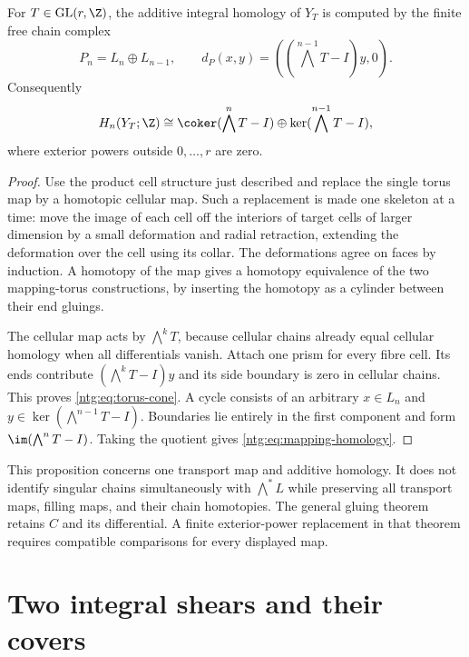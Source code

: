 \begin{proposition}\label{ntg:prop:mappingtorus}
For $T\in\mathrm{GL}(r,\Z)$, the additive integral homology of
$Y_T$ is computed by the finite free chain complex
\begin{equation}\label{ntg:eq:torus-cone}
 P_n=L_n\oplus L_{n-1},\qquad
 d_P(x,y)=((\bigwedge^{n-1}T-I)y,0).
\end{equation}
Consequently
\begin{equation}\label{ntg:eq:mapping-homology}
 H_n(Y_T;\Z)\cong
 \coker(\bigwedge^nT-I)\oplus
 \ker(\bigwedge^{n-1}T-I),
\end{equation}
where exterior powers outside $0,\ldots,r$ are zero.
\end{proposition}
\begin{proof}
Use the product cell structure just described and replace the single
torus map by a homotopic cellular map. Such a replacement is made
one skeleton at a time: move the image of each cell off the interiors
of target cells of larger dimension by a small deformation and radial
retraction, extending the deformation over the cell using its collar.
The deformations agree on faces by induction. A homotopy of the map
gives a homotopy equivalence of the two mapping-torus constructions,
by inserting the homotopy as a cylinder between their end gluings.

The cellular map acts by $\bigwedge^kT$, because cellular chains
already equal cellular homology when all differentials vanish.
Attach one prism for every fibre cell. Its ends contribute
$(\bigwedge^kT-I)y$ and its side boundary is zero in cellular
chains. This proves \eqref{ntg:eq:torus-cone}. A cycle consists of an
arbitrary $x\in L_n$ and $y\in\ker(\bigwedge^{n-1}T-I)$.
Boundaries lie entirely in the first component and form
$\im(\bigwedge^nT-I)$. Taking the quotient gives
\eqref{ntg:eq:mapping-homology}.
\end{proof}

This proposition concerns one transport map and additive homology.
It does not identify singular chains simultaneously with
$\bigwedge^*L$ while preserving all transport maps, filling maps,
and their chain homotopies. The general gluing theorem retains $C$
and its differential. A finite exterior-power replacement in that
theorem requires compatible comparisons for every displayed map.

\section{Two integral shears and their covers}\label{ntg:sec:shears}

